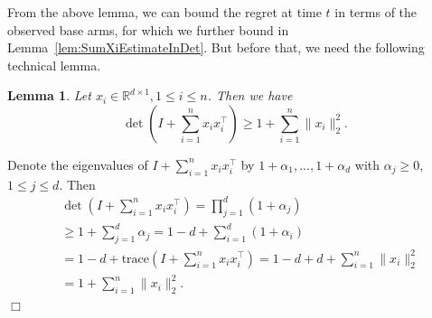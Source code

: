 \documentclass{article}
\newcommand{\bbeta}{\boldsymbol{\beta}}
\newcommand{\EE}{\mathbb{E}}
\newcommand{\RR}{\mathbb{R}}
\newcommand{\bOne}{\mathbbm{1}}
\newcommand{\bA}{\mathbf{A}}
\newcommand{\ba}{\mathbf{a}}
\newcommand{\bB}{\mathbf{B}}
\newcommand{\bO}{\mathbf{O}}
\newcommand{\bU}{\mathbf{U}}
\newcommand{\bV}{\mathbf{V}}
\newcommand{\trace}{\mathrm{trace}}
\newcommand{\abs}[1]{\left| #1 \right|}
\newcommand{\norm}[1]{\| #1 \|}
\newtheorem{lemma}[theorem]{Lemma}%
\newenvironment{proof}{\noindent {\textbf{Proof. }}}{$\Box$ \medskip}
\begin{document}

From the above lemma, we can bound the regret at time $t$ in terms of the observed base arms, for which we further bound in Lemma~\ref{lem:SumXiEstimateInDet}.
But before that, we need the following technical lemma.

\begin{lemma} %
  \label{lem:detTech}
  Let $x_i \in \RR^{d \times 1}, 1 \leq i \leq n$. Then we have
  $$
    \det\left(I + \sum_{i=1}^n x_i x_i^{\top}\right) \geq 1 + \sum_{i=1}^n \norm{x_i}_2^2.
  $$
\end{lemma}
\begin{proof}
  Denote the eigenvalues of $I + \sum_{i=1}^n x_i x_i^{\top}$ by $1+\alpha_1,...,1+\alpha_d$ with $\alpha_j \geq 0$, $1\leq j\leq d$. Then
  \begin{align*}
    &\det(I + \sum_{i=1}^n x_i x_i^{\top})= \prod_{j=1}^d (1 + \alpha_j)\\
    &\geq 1 +\sum_{j=1}^d \alpha_j =1-d + \sum_{i=1}^d (1+\alpha_i) \\
    &=1-d + \trace(I + \sum_{i=1}^n x_i x_i^{\top})= 1-d + d + \sum_{i=1}^n \norm{x_i}_2^2\\
    &=1 + \sum_{i=1}^n \norm{x_i}_2^2.
  \end{align*}
\end{proof}
\end{document}
